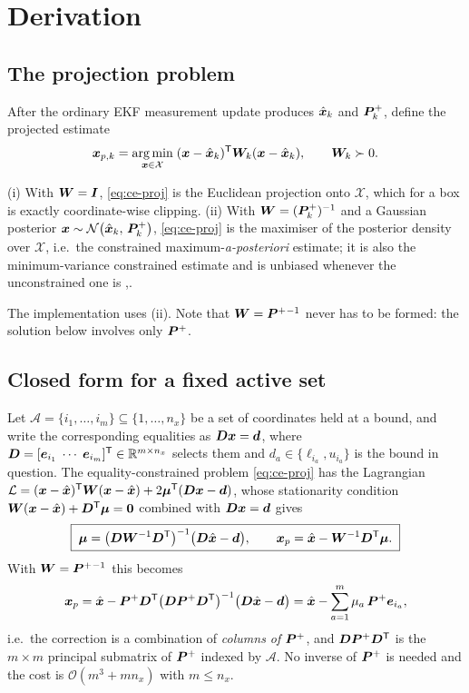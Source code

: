 \section{Derivation}

\subsection{The projection problem}
After the ordinary EKF measurement update produces $\hat{\bm{x}}_k$ and $\bm{P}^{+}_k$, define the projected
estimate
\begin{equation}
\bm{x}_{p,k}=\operatorname*{arg\,min}_{\bm{x}\in\mathcal{X}}\;(\bm{x}-\hat{\bm{x}}_k)^{\mathsf{T}}\bm{W}_k(\bm{x}-\hat{\bm{x}}_k),
\qquad \bm{W}_k\succ0.
\label{eq:ce-proj}
\end{equation}
\begin{proposition}\label{prop:ce-W}
(i) With $\bm{W}=\bm{I}$, \eqref{eq:ce-proj} is the Euclidean projection onto $\mathcal{X}$, which for a
box is exactly coordinate-wise clipping.
(ii) With $\bm{W}=(\bm{P}^{+}_k)^{-1}$ and a Gaussian posterior $\bm{x}\sim\mathcal{N}\!\left(\hat{\bm{x}}_k,\,\bm{P}^{+}_k\right)$,
\eqref{eq:ce-proj} is the maximiser of the posterior density over $\mathcal{X}$, i.e.\ the
constrained maximum-\emph{a-posteriori} estimate; it is also the minimum-variance constrained
estimate and is unbiased whenever the unconstrained one is
\cite[\S2.1]{simon2010constraints},\cite{simonchia2002}.
\end{proposition}
The implementation uses (ii).  Note that $\bm{W}=\bm{P}^{+}{}^{-1}$ never has to be formed: the solution
below involves only $\bm{P}^{+}$.

\subsection{Closed form for a fixed active set}
Let $\mathcal{A}=\{i_1,\dots,i_m\}\subseteq\{1,\dots,n_x\}$ be a set of coordinates held at a
bound, and write the corresponding equalities as $\bm{D}\bm{x}=\bm{d}$, where
$\bm{D}=[\bm{e}_{i_1}\;\cdots\;\bm{e}_{i_m}]^{\mathsf{T}}\in\mathbb{R}^{m\times n_x}$ selects them and
$d_a\in\{\ell_{i_a},u_{i_a}\}$ is the bound in question.  The equality-constrained problem
\eqref{eq:ce-proj} has the Lagrangian
$\mathcal{L}=(\bm{x}-\hat{\bm{x}})^{\mathsf{T}}\bm{W}(\bm{x}-\hat{\bm{x}})+2\bm\mu^{\mathsf{T}}(\bm{D}\bm{x}-\bm{d})$, whose stationarity condition
$\bm{W}(\bm{x}-\hat{\bm{x}})+\bm{D}^{\mathsf{T}}\bm\mu=\bm 0$ combined with $\bm{D}\bm{x}=\bm{d}$ gives
\begin{equation}
\boxed{\;
\bm\mu=\big(\bm{D}\bm{W}^{-1}\bm{D}^{\mathsf{T}}\big)^{-1}\big(\bm{D}\hat{\bm{x}}-\bm{d}\big),
\qquad
\bm{x}_p=\hat{\bm{x}}-\bm{W}^{-1}\bm{D}^{\mathsf{T}}\bm\mu .\;}
\label{eq:ce-closed}
\end{equation}
With $\bm{W}=\bm{P}^{+}{}^{-1}$ this becomes
\begin{equation}
\bm{x}_p=\hat{\bm{x}}-\bm{P}^{+}\bm{D}^{\mathsf{T}}\big(\bm{D}\bm{P}^{+}\bm{D}^{\mathsf{T}}\big)^{-1}\big(\bm{D}\hat{\bm{x}}-\bm{d}\big)
     =\hat{\bm{x}}-\sum_{a=1}^{m}\mu_a\,\bm{P}^{+}\bm{e}_{i_a},
\label{eq:ce-closedP}
\end{equation}
i.e.\ the correction is a combination of \emph{columns of $\bm{P}^{+}$}, and $\bm{D}\bm{P}^{+}\bm{D}^{\mathsf{T}}$ is the
$m\times m$ principal submatrix of $\bm{P}^{+}$ indexed by $\mathcal{A}$.  No inverse of $\bm{P}^{+}$ is
needed and the cost is $\mathcal{O}(m^3+mn_x)$ with $m\le n_x$.

